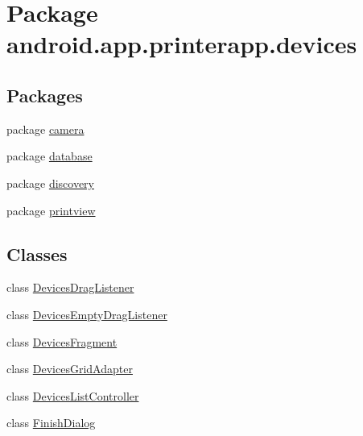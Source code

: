 \hypertarget{namespaceandroid_1_1app_1_1printerapp_1_1devices}{}\section{Package android.\+app.\+printerapp.\+devices}
\label{namespaceandroid_1_1app_1_1printerapp_1_1devices}
\subsection*{Packages}
\begin{DoxyCompactItemize}
\item 
package \hyperlink{namespaceandroid_1_1app_1_1printerapp_1_1devices_1_1camera}{camera}
\item 
package \hyperlink{namespaceandroid_1_1app_1_1printerapp_1_1devices_1_1database}{database}
\item 
package \hyperlink{namespaceandroid_1_1app_1_1printerapp_1_1devices_1_1discovery}{discovery}
\item 
package \hyperlink{namespaceandroid_1_1app_1_1printerapp_1_1devices_1_1printview}{printview}
\end{DoxyCompactItemize}
\subsection*{Classes}
\begin{DoxyCompactItemize}
\item 
class \hyperlink{classandroid_1_1app_1_1printerapp_1_1devices_1_1_devices_drag_listener}{Devices\+Drag\+Listener}
\item 
class \hyperlink{classandroid_1_1app_1_1printerapp_1_1devices_1_1_devices_empty_drag_listener}{Devices\+Empty\+Drag\+Listener}
\item 
class \hyperlink{classandroid_1_1app_1_1printerapp_1_1devices_1_1_devices_fragment}{Devices\+Fragment}
\item 
class \hyperlink{classandroid_1_1app_1_1printerapp_1_1devices_1_1_devices_grid_adapter}{Devices\+Grid\+Adapter}
\item 
class \hyperlink{classandroid_1_1app_1_1printerapp_1_1devices_1_1_devices_list_controller}{Devices\+List\+Controller}
\item 
class \hyperlink{classandroid_1_1app_1_1printerapp_1_1devices_1_1_finish_dialog}{Finish\+Dialog}
\end{DoxyCompactItemize}
